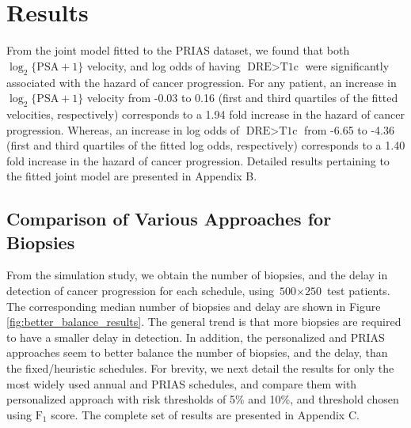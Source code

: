 
\section{Results}
\label{sec:results}
From the joint model fitted to the PRIAS dataset, we found that both $\log_2 \{\mbox{PSA} + 1\}$ velocity,  and log odds of having $\mbox{DRE} > \mbox{T1c}$  were significantly associated with the hazard of cancer progression. For any patient, an increase in $\log_2 \{\mbox{PSA} + 1\}$ velocity from -0.03 to 0.16 (first and third quartiles of the fitted velocities, respectively) corresponds to a 1.94 fold increase in the hazard of cancer progression. Whereas, an increase in log odds of $\mbox{DRE} > \mbox{T1c}$ from -6.65 to -4.36 (first and third quartiles of the fitted log odds, respectively) corresponds to a 1.40 fold increase in the hazard of cancer progression. Detailed results pertaining to the fitted joint model are presented in Appendix B.

\subsection{Comparison of Various Approaches for Biopsies}
From the simulation study, we obtain the number of biopsies, and the delay in detection of cancer progression for each schedule, using ${\mbox{500} \times \mbox{250}}$ test patients. The corresponding median number of biopsies and delay are shown in Figure \ref{fig:better_balance_results}. The general trend is that more biopsies are required to have a smaller delay in detection. In addition, the personalized and PRIAS approaches seem to better balance the number of biopsies, and the delay, than the fixed/heuristic schedules. For brevity, we next detail the results for only the most widely used annual and PRIAS schedules, and compare them with personalized approach with risk thresholds of 5\% and 10\%, and threshold chosen using $\mbox{F}_1$ score. The complete set of results are presented in Appendix C.

